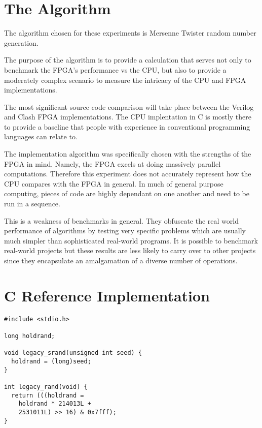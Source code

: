 \documentclass{article}
\begin{document}
\begin{multicols}{2}
    \section{The Algorithm}

    The algorithm chosen for these experiments is Mersenne Twister
    random number generation.

    The purpose of the algorithm is to provide a calculation that serves not only to benchmark
    the FPGA's performance vs the CPU, but also to provide a moderately complex
    scenario to measure the intricacy of the CPU and FPGA implementations.

    The most significant source code comparison will take place between the Verilog and
    Clash FPGA implementations. The CPU implentation in C is mostly there to provide
    a baseline that people with experience in conventional programming languages
    can relate to.

    The implementation algorithm was specifically chosen with the strengths of the FPGA
    in mind. Namely, the FPGA excels at doing massively parallel computations.
    Therefore this experiment does not accurately represent how the CPU compares
    with the FPGA in general. In much of general purpose computing, pieces of code
    are highly dependant on one another and need to be run in a sequence.

    This is a weakness of benchmarks in general. They obfuscate the real world performance
    of algorithms by testing very specific problems which are usually much simpler
    than sophisticated real-world programs. It is possible to benchmark real-world
    projects but these results are less likely to carry over to other projects since
    they encapsulate an amalgamation of a diverse number of operations.

    \section{C Reference Implementation}

    \lstset{language=C}

    \begin{lstlisting}
#include <stdio.h>

long holdrand;

void legacy_srand(unsigned int seed) {
  holdrand = (long)seed;
}

int legacy_rand(void) {
  return (((holdrand =
    holdrand * 214013L +
    2531011L) >> 16) & 0x7fff);
}
    \end{lstlisting}


\end{multicols}
\end{document}
